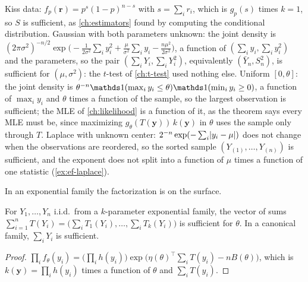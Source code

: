 \begin{worked}
Kiss data: $f_p(\mathbf{r}) = p^{s}(1 - p)^{n - s}$ with $s = \sum_i r_i$, which is $g_p(s)$ times $k = 1$, so $S$ is sufficient, as \cref{ch:estimators} found by computing the conditional distribution. Gaussian with both parameters unknown: the joint density is $(2\pi\sigma^2)^{-n/2}\exp\big(-\frac{1}{2\sigma^2}\sum_i y_i^2 + \frac{\mu}{\sigma^2}\sum_i y_i - \frac{n\mu^2}{2\sigma^2}\big)$, a function of $(\sum_i y_i, \sum_i y_i^2)$ and the parameters, so the pair $(\sum_i Y_i, \sum_i Y_i^2)$, equivalently $(\bar{Y}_n, S_n^2)$, is sufficient for $(\mu, \sigma^2)$: the $t$-test of \cref{ch:t-test} used nothing else. Uniform $[0, \theta]$: the joint density is $\theta^{-n}\ind(\max_i y_i \leq \theta)\ind(\min_i y_i \geq 0)$, a function of $\max_i y_i$ and $\theta$ times a function of the sample, so the largest observation is sufficient; the MLE of \cref{ch:likelihood} is a function of it, as the theorem says every MLE must be, since maximizing $g_\theta(T(\mathbf{y}))\,k(\mathbf{y})$ in $\theta$ uses the sample only through $T$. Laplace with unknown center: $2^{-n}\exp(-\sum_i\lvert y_i - \mu\rvert)$ does not change when the observations are reordered, so the sorted sample $(Y_{(1)}, \ldots, Y_{(n)})$ is sufficient, and the exponent does not split into a function of $\mu$ times a function of one statistic (\cref{ex:ef-laplace}).
\end{worked}

In an exponential family the factorization is on the surface.

\begin{corollary}
\label{cor:ef-sufficient}
For $Y_1, \ldots, Y_n$ i.i.d.\ from a $k$-parameter exponential family, the vector of sums $\sum_{i=1}^n T(Y_i) = \big(\sum_i T_1(Y_i), \ldots, \sum_i T_k(Y_i)\big)$ is sufficient for $\theta$.
In a canonical family, $\sum_i Y_i$ is sufficient.
\end{corollary}
\begin{proof}
$\prod_i f_\theta(y_i) = \big(\prod_i h(y_i)\big)\exp\big(\eta(\theta)^\top\sum_i T(y_i) - nB(\theta)\big)$, which is $k(\mathbf{y}) = \prod_i h(y_i)$ times a function of $\theta$ and $\sum_i T(y_i)$.
\end{proof}

